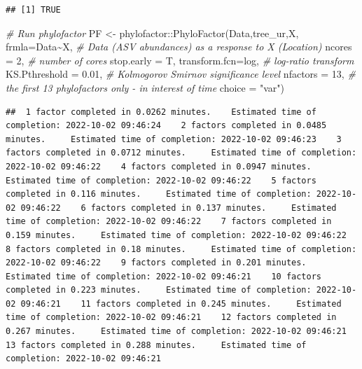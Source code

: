 \documentclass[
]{book}
\newenvironment{Shaded}{\begin{snugshade}}{\end{snugshade}}
\newcommand{\AttributeTok}[1]{\textcolor[rgb]{0.77,0.63,0.00}{#1}}
\newcommand{\CommentTok}[1]{\textcolor[rgb]{0.56,0.35,0.01}{\textit{#1}}}
\newcommand{\DecValTok}[1]{\textcolor[rgb]{0.00,0.00,0.81}{#1}}
\newcommand{\FloatTok}[1]{\textcolor[rgb]{0.00,0.00,0.81}{#1}}
\newcommand{\FunctionTok}[1]{\textcolor[rgb]{0.00,0.00,0.00}{#1}}
\newcommand{\NormalTok}[1]{#1}
\newcommand{\OtherTok}[1]{\textcolor[rgb]{0.56,0.35,0.01}{#1}}
\newcommand{\SpecialCharTok}[1]{\textcolor[rgb]{0.00,0.00,0.00}{#1}}
\newcommand{\StringTok}[1]{\textcolor[rgb]{0.31,0.60,0.02}{#1}}
\begin{document}
\begin{verbatim}
## [1] TRUE
\end{verbatim}

\begin{Shaded}
\begin{Highlighting}[]
\CommentTok{\# Run phylofactor}
\NormalTok{PF }\OtherTok{\textless{}{-}}\NormalTok{  phylofactor}\SpecialCharTok{::}\FunctionTok{PhyloFactor}\NormalTok{(Data,tree\_ur,X, }
        \AttributeTok{frmla=}\NormalTok{Data}\SpecialCharTok{\textasciitilde{}}\NormalTok{X,    }\CommentTok{\# Data (ASV abundances) as a response to X (Location)}
        \AttributeTok{ncores =} \DecValTok{2}\NormalTok{,      }\CommentTok{\# number of cores }
        \AttributeTok{stop.early =}\NormalTok{ T, }
        \AttributeTok{transform.fcn=}\NormalTok{log,    }\CommentTok{\# log{-}ratio transform}
        \AttributeTok{KS.Pthreshold =} \FloatTok{0.01}\NormalTok{, }\CommentTok{\# Kolmogorov Smirnov significance level }
        \AttributeTok{nfactors =} \DecValTok{13}\NormalTok{, }\CommentTok{\# the first 13 phylofactors only {-} in interest of time }
        \AttributeTok{choice =} \StringTok{"var"}\NormalTok{)}
\end{Highlighting}
\end{Shaded}

\begin{verbatim}
##  1 factor completed in 0.0262 minutes.    Estimated time of completion: 2022-10-02 09:46:24    2 factors completed in 0.0485 minutes.     Estimated time of completion: 2022-10-02 09:46:23    3 factors completed in 0.0712 minutes.     Estimated time of completion: 2022-10-02 09:46:22    4 factors completed in 0.0947 minutes.     Estimated time of completion: 2022-10-02 09:46:22    5 factors completed in 0.116 minutes.     Estimated time of completion: 2022-10-02 09:46:22    6 factors completed in 0.137 minutes.     Estimated time of completion: 2022-10-02 09:46:22    7 factors completed in 0.159 minutes.     Estimated time of completion: 2022-10-02 09:46:22    8 factors completed in 0.18 minutes.     Estimated time of completion: 2022-10-02 09:46:22    9 factors completed in 0.201 minutes.     Estimated time of completion: 2022-10-02 09:46:21    10 factors completed in 0.223 minutes.     Estimated time of completion: 2022-10-02 09:46:21    11 factors completed in 0.245 minutes.     Estimated time of completion: 2022-10-02 09:46:21    12 factors completed in 0.267 minutes.     Estimated time of completion: 2022-10-02 09:46:21    13 factors completed in 0.288 minutes.     Estimated time of completion: 2022-10-02 09:46:21   
\end{verbatim}
\end{document}
